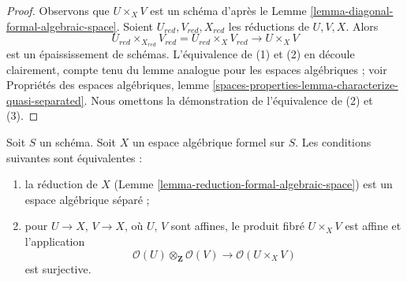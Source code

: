 \begin{proof}
Observons que $U \times_X V$ est un schéma d'après le
Lemme \ref{lemma-diagonal-formal-algebraic-space}.
Soient $U_{red}, V_{red}, X_{red}$ les réductions de $U, V, X$.
Alors
$$
U_{red} \times_{X_{red}} V_{red} = U_{red} \times_X V_{red} \to U \times_X V
$$
est un épaississement de schémas. L'équivalence de (1) et (2) en découle
clairement, compte tenu du lemme analogue pour les espaces algébriques ; voir
Propriétés des espaces algébriques, lemme
\ref{spaces-properties-lemma-characterize-quasi-separated}.
Nous omettons la démonstration de l'équivalence de (2) et (3).
\end{proof}

\begin{lemma}
\label{lemma-characterize-separated}
Soit $S$ un schéma. Soit $X$ un espace algébrique formel sur $S$.
Les conditions suivantes sont équivalentes :
\begin{enumerate}
\item la réduction de $X$
(Lemme \ref{lemma-reduction-formal-algebraic-space}) est un espace
algébrique séparé ;
\item pour $U \to X$, $V \to X$, où $U$, $V$ sont affines,
le produit fibré $U \times_X V$ est affine et l'application
$$
\mathcal{O}(U) \otimes_\mathbf{Z} \mathcal{O}(V)
\longrightarrow
\mathcal{O}(U \times_X V)
$$
est surjective.
\end{enumerate}
\end{lemma}

